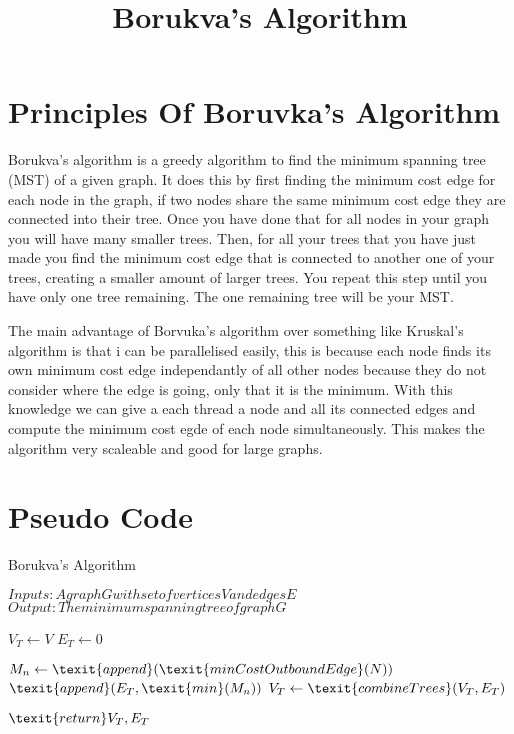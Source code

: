 \documentclass{report}
\title{Borukva's Algorithm}
\author{}
\begin{document}
\maketitle

\section{Principles Of Boruvka's Algorithm}
Borukva's algorithm is a greedy algorithm to find the minimum spanning tree (MST) of a given graph.
It does this by first finding the minimum cost edge for each node in the graph, if two nodes share the same minimum cost edge they are connected into their tree.
Once you have done that for all nodes in your graph you will have many smaller trees.
Then, for all your trees that you have just made you find the minimum cost edge that is connected to another one of your trees, creating a smaller amount of larger trees.
You repeat this step until you have only one tree remaining.
The one remaining tree will be your MST.

The main advantage of Borvuka's algorithm over something like Kruskal's algorithm is that i can be parallelised easily, this is because each node finds its own minimum cost edge independantly of all other nodes because they do not consider where the edge is going, only that it is the minimum.
With this knowledge we can give a each thread a node and all its connected edges and compute the minimum cost egde of each node simultaneously.
This makes the algorithm very scaleable and good for large graphs.

\section{Pseudo Code}

\caption{Borukva's Algorithm}

\begin{algorithmic}
    \State $ Inputs: A graph G with set of vertices V and edges E $
    \State $ Output: The minimum spanning tree of graph G $

    \State $ V_{T} \gets V $
    \State $ E_{T} \gets 0 $
    
                \State $ M_{n} \gets \texit{append}(\texit{minCostOutboundEdge}(N)) $
            \EndFor
            \State $ \texit{append}(E_{T}, \texit{min}(M_{n})) $
        \State $ V_{T} \gets \texit{combineTrees}(V_{T}, E_{T}) $
        \EndFor
    \EndWhile

    \State $ \texit{return} V_{T}, E_{T} $
\end{algorithmic}
\end{document}
